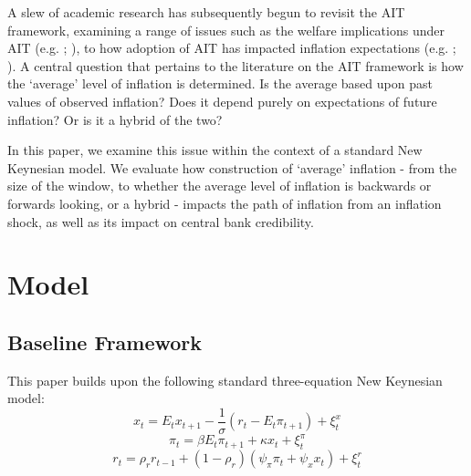 \documentclass[english,authoryear,12pt]{elsarticle}
\begin{document}
A slew of academic research has subsequently begun to revisit the AIT framework, examining a range of issues such as the welfare implications under AIT (e.g. \citealp{budianto_average_2020}; \citealp{eo_average_2020}), to how adoption of AIT has impacted inflation expectations (e.g. \citealp{coibion_average_2020}; \citealp{hoffmann_would_2022}). A central question that pertains to the literature on the AIT framework is how the `average' level of inflation is determined. Is the average based upon past values of observed inflation? Does it depend purely on expectations of future inflation? Or is it a hybrid of the two? 

In this paper, we examine this issue within the context of a standard New Keynesian model. We evaluate how construction of `average' inflation - from the size of the window, to whether the average level of inflation is backwards or forwards looking, or a hybrid - impacts the path of inflation from an inflation shock, as well as its impact on central bank credibility.


\section{\label{Model}Model}

\subsection{Baseline Framework}

This paper builds upon the following standard three-equation New Keynesian model:
\begin{equation}\label{eq:IS}
	x_t = E_t x_{t+1} - \frac{1}{\sigma} \left( r_t - E_t \pi_{t+1} \right) + \xi_t^{x}
\end{equation}
\begin{equation}\label{eq:PhillipsCurve}
	\pi_t = \beta E_t \pi_{t+1} + \kappa x_t + \xi_t^{\pi}
\end{equation}
\begin{equation}\label{eq:TaylorRule}
	r_t = \rho_r r_{t-1} + (1-\rho_r) \left( \psi_\pi \pi_t + \psi_x x_t \right) + \xi_t^{r}
\end{equation}
\end{document}
